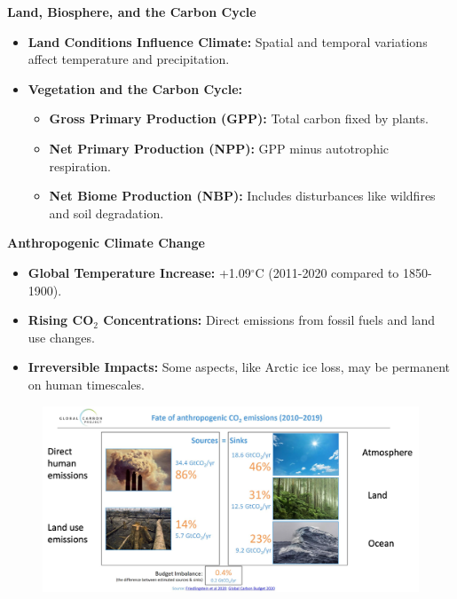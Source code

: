 \documentclass[fontsize=8pt, a4paper, landscape, fleqn]{scrartcl}
\renewcommand{\subsection}[1]{%
    \noindent\colorbox{subsectioncolor}{%
        \parbox{\dimexpr\columnwidth-2\fboxsep}{\color{white}\textbf{#1}}}%
    \vspace{0.5mm}%
}
\begin{document}
\begin{multicols*}{3}[\raggedcolumns]
\subsection{Land, Biosphere, and the Carbon Cycle}
\begin{itemize}
    \item \textbf{Land Conditions Influence Climate:} Spatial and temporal variations affect temperature and precipitation.
    \item \textbf{Vegetation and the Carbon Cycle:}
    \begin{itemize}
        \item \textbf{Gross Primary Production (GPP):} Total carbon fixed by plants.
        \item \textbf{Net Primary Production (NPP):} GPP minus autotrophic respiration.
        \item \textbf{Net Biome Production (NBP):} Includes disturbances like wildfires and soil degradation.
    \end{itemize}
\end{itemize}

\subsection{Anthropogenic Climate Change}
\begin{itemize}
    \item \textbf{Global Temperature Increase:} +1.09$^{\circ}$C (2011-2020 compared to 1850-1900).
    \item \textbf{Rising CO$_2$ Concentrations:} Direct emissions from fossil fuels and land use changes.
    \item \textbf{Irreversible Impacts:} Some aspects, like Arctic ice loss, may be permanent on human timescales.
\end{itemize}

\begin{figure}[H]
    \centering
    \includegraphics[width=1\linewidth]{CS//img/Global_Carbon_sink.png}
\end{figure}


\end{multicols*}
\end{document}

